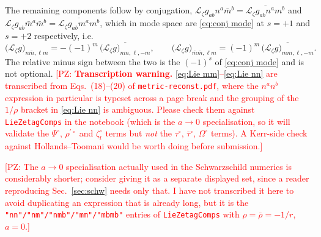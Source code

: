 \documentclass[preprint,aps,nofootinbib,a4paper,superscriptaddress,longbibliography,amsfonts, amssymb,amsmath,titlepage]{revtex4-1}
\numberwithin{equation}{section} %
\newcommand{\PZ}[1]{\textcolor{red}{\textsf{[PZ: #1]}}}
\def\tah{{\tau}^\circ}
\def\tabh{{\bar\tau}^\circ}
\def\Psih{ {\Psi}^\circ}
\def\rhopH{\rho^{\prime \circ}}
\def\Oh{{\Omega}^\circ}
\newcommand{\emm}{m}
\def\l{\ensuremath{\ell}}
\newcommand{\Lie}{{\mathcal L}}
\def\zetal{\zeta^{\circ}_{l}}
\begin{document}
The remaining components follow by conjugation,
$\Lie_{\zeta}g_{ab}n^{a}\bar m^{b}=\overline{\Lie_{\zeta}g_{ab}n^{a}m^{b}}$
and
$\Lie_{\zeta}g_{ab}\bar m^{a}\bar m^{b}=\overline{\Lie_{\zeta}g_{ab}m^{a}m^{b}}$,
which in mode space are \eqref{eq:conj mode} at $s=+1$ and $s=+2$
respectively, i.e.
\begin{equation}\label{eq:Lie conj modes}
\big(\Lie_{\zeta}g\big)_{n\bar m,\l\emm}
= -(-1)^{\emm}\,\overline{\big(\Lie_{\zeta}g\big)_{nm,\l,-\emm}},
\qquad
\big(\Lie_{\zeta}g\big)_{\bar m\bar m,\l\emm}
= (-1)^{\emm}\,\overline{\big(\Lie_{\zeta}g\big)_{mm,\l,-\emm}} .
\end{equation}
The relative minus sign between the two is the $(-1)^{s}$ of
\eqref{eq:conj mode} and is not optional.
\PZ{\textbf{Transcription warning.}  \eqref{eq:Lie mm}--\eqref{eq:Lie nn} are
transcribed from Eqs.~(18)--(20) of \texttt{metric-reconst.pdf}, where the
$n^{a}n^{b}$ expression in particular is typeset across a page break and the
grouping of the $1/\rho$ bracket in \eqref{eq:Lie nn} is ambiguous.  Please
check them against \texttt{LieZetagComps} in the notebook (which is the
$a\to0$ specialisation, so it will validate the $\Psih$, $\rhopH$ and
$\zetal$ terms but \emph{not} the $\tah$, $\tabh$, $\Oh$ terms).  A Kerr-side
check against Hollands--Toomani would be worth doing before submission.}

\PZ{The $a\to0$ specialisation actually used in the Schwarzschild numerics is
considerably shorter; consider giving it as a separate displayed set, since a
reader reproducing Sec.~\ref{sec:schw} needs only that.  I have not
transcribed it here to avoid duplicating an expression that is already long,
but it is the \texttt{"nn"/"nm"/"nmb"/"mm"/"mbmb"} entries of
\texttt{LieZetagComps} with $\rho=\bar\rho=-1/r$, $a=0$.}




\end{document}
